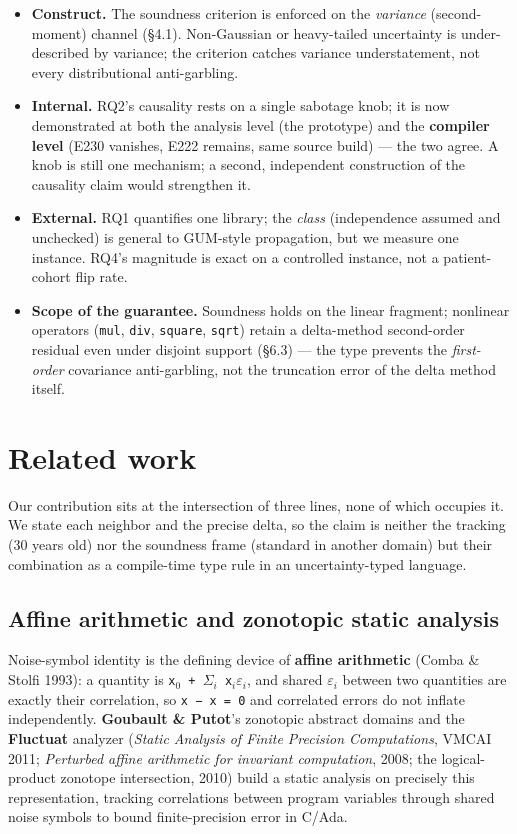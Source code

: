\documentclass[sigplan,review,anonymous,10pt]{acmart}
\begin{document}
\begin{itemize}
  \item \textbf{Construct.} The soundness criterion is enforced on the \emph{variance} (second-moment) channel (§4.1). Non-Gaussian or heavy-tailed uncertainty is under-described by variance; the criterion catches variance understatement, not every distributional anti-garbling.
  \item \textbf{Internal.} RQ2's causality rests on a single sabotage knob; it is now demonstrated at both the analysis level (the prototype) and the \textbf{compiler level} (E230 vanishes, E222 remains, same source build) --- the two agree. A knob is still one mechanism; a second, independent construction of the causality claim would strengthen it.
  \item \textbf{External.} RQ1 quantifies one library; the \emph{class} (independence assumed and unchecked) is general to GUM-style propagation, but we measure one instance. RQ4's magnitude is exact on a controlled instance, not a patient-cohort flip rate.
  \item \textbf{Scope of the guarantee.} Soundness holds on the linear fragment; nonlinear operators (\texttt{mul}, \texttt{div}, \texttt{square}, \texttt{sqrt}) retain a delta-method second-order residual even under disjoint support (§6.3) --- the type prevents the \emph{first-order} covariance anti-garbling, not the truncation error of the delta method itself.
\end{itemize}

\section{Related work}

Our contribution sits at the intersection of three lines, none of which occupies it. We state each neighbor and the precise delta, so the claim is neither the tracking (30 years old) nor the soundness frame (standard in another domain) but their combination as a compile-time type rule in an uncertainty-typed language.

\subsection{Affine arithmetic and zonotopic static analysis}

Noise-symbol identity is the defining device of \textbf{affine arithmetic} (Comba \& Stolfi 1993): a quantity is \texttt{x$_{0}$ + $\Sigma_{i}$ x$_{i}\varepsilon_{i}$}, and shared \texttt{$\varepsilon_{i}$} between two quantities are exactly their correlation, so \texttt{x − x = 0} and correlated errors do not inflate independently. \textbf{Goubault \& Putot}'s zonotopic abstract domains and the \textbf{Fluctuat} analyzer (\emph{Static Analysis of Finite Precision Computations}, VMCAI 2011; \emph{Perturbed affine arithmetic for invariant computation}, 2008; the logical-product zonotope intersection, 2010) build a static analysis on precisely this representation, tracking correlations between program variables through shared noise symbols to bound finite-precision error in C/Ada.
\end{document}
